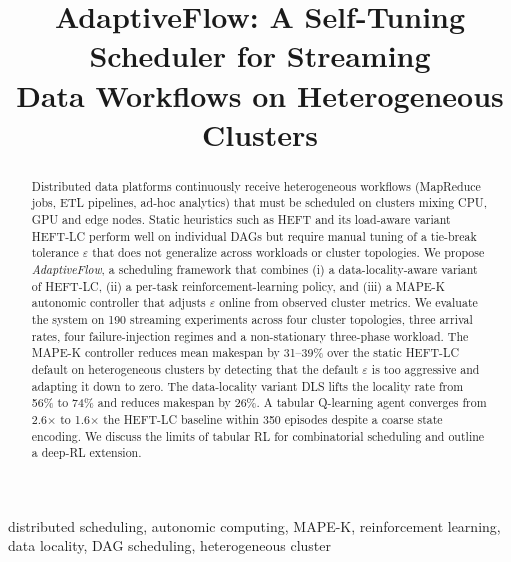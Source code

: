 \documentclass[conference]{IEEEtran}
\begin{document}
\title{AdaptiveFlow: A Self-Tuning Scheduler for Streaming\\
Data Workflows on Heterogeneous Clusters}

\author{
}

\maketitle

\begin{abstract}
Distributed data platforms continuously receive heterogeneous workflows
(MapReduce jobs, ETL pipelines, ad-hoc analytics) that must be scheduled on
clusters mixing CPU, GPU and edge nodes. Static heuristics such as HEFT and
its load-aware variant HEFT-LC perform well on individual DAGs but require
manual tuning of a tie-break tolerance \(\varepsilon\) that does not generalize
across workloads or cluster topologies. We propose \emph{AdaptiveFlow}, a
scheduling framework that combines (i) a data-locality-aware variant of
HEFT-LC, (ii) a per-task reinforcement-learning policy, and (iii) a MAPE-K
autonomic controller that adjusts \(\varepsilon\) online from observed cluster
metrics. We evaluate the system on 190 streaming experiments across four
cluster topologies, three arrival rates, four failure-injection regimes
and a non-stationary three-phase workload. The MAPE-K controller reduces
mean makespan by 31--39\% over the static HEFT-LC default on
heterogeneous clusters by detecting that the default \(\varepsilon\) is
too aggressive and adapting it down to zero. The data-locality variant
DLS lifts the locality rate from 56\% to 74\% and reduces makespan by
26\%. A tabular Q-learning agent converges from 2.6\(\times\) to
1.6\(\times\) the HEFT-LC baseline within 350 episodes despite a coarse
state encoding. We discuss the limits of tabular RL for combinatorial
scheduling and outline a deep-RL extension.
\end{abstract}

\begin{IEEEkeywords}
distributed scheduling, autonomic computing, MAPE-K, reinforcement learning,
data locality, DAG scheduling, heterogeneous cluster
\end{IEEEkeywords}
\end{document}
